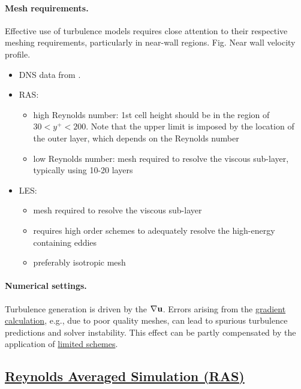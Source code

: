 \documentclass{article}
\numberwithin{equation}{section}
\begin{document}
\paragraph{Mesh requirements.} Effective use of turbulence models requires close attention to their respective meshing requirements, particularly in near-wall regions. \textsf{Fig. Near wall velocity profile.}
\begin{itemize}
	\item DNS data from \cite{Lee_Moser2015}.
	\item RAS:
	\begin{itemize}
		\item high  Reynolds number: 1st cell height should be in the region of $30 < y^+ < 200$. Note that the upper limit is imposed by the location of the outer layer, which depends on the Reynolds number
		\item low Reynolds number: mesh required to resolve the viscous sub-layer, typically using 10-20 layers
	\end{itemize}
	\item LES:
	\begin{itemize}
		\item mesh required to resolve the viscous sub-layer
		\item requires high order schemes to adequately resolve the high-energy containing eddies
		\item preferably isotropic mesh		
	\end{itemize}
\end{itemize}

\paragraph{Numerical settings.} Turbulence generation is driven by the $\nabla{\bf u}$. Errors arising from the \href{https://www.openfoam.com/documentation/guides/latest/doc/guide-schemes-gradient.html}{gradient calculation}, e.g., due to poor quality meshes, can lead to spurious turbulence predictions and solver instability. This effect can be partly compensated by the application of \href{https://www.openfoam.com/documentation/guides/latest/doc/guide-schemes-gradient.html#sec-schemes-gradient-options-gradient-limiters}{limited schemes}.

\subsection{\href{https://www.openfoam.com/documentation/guides/latest/doc/guide-turbulence-ras.html}{Reynolds Averaged Simulation (RAS)}}
\end{document}
